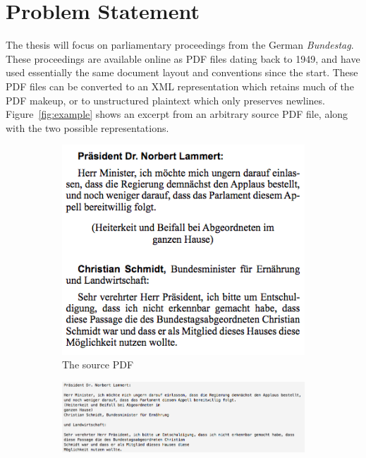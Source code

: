 \section*{Problem Statement}
The thesis will focus on parliamentary proceedings from the German
\emph{Bundestag}. These proceedings are available online as PDF files dating
back to 1949, and have used essentially the same document layout and conventions
since the start. These PDF files can be converted to an XML representation which
retains much of the PDF makeup, or to unstructured plaintext which only
preserves newlines. Figure~\ref{fig:example} shows an excerpt from an arbitrary
source PDF file, along with the two possible representations.

\begin{figure}[htbp]
  \centering
  \begin{subfigure}[b]{0.4\textwidth} 
    \centering
    \includegraphics[width=\textwidth]{figures/source.png}
    \caption{The source PDF}
  \end{subfigure}
  \begin{subfigure}[b]{0.59\textwidth}
	\centering
    \includegraphics[width=\textwidth]{figures/plain.png}

\end{subfigure}
\end{figure}
